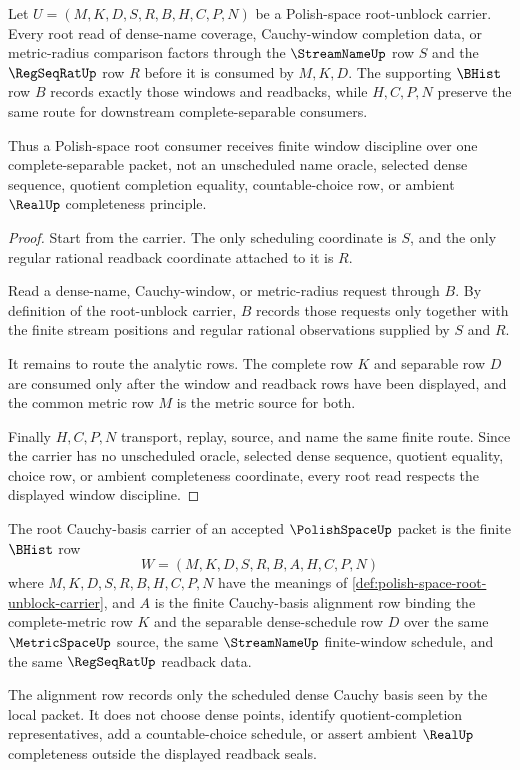 \begin{theorem}
\label{thm:polish-space-root-unblock-window-discipline}
Let $U=(M,K,D,S,R,B,H,C,P,N)$ be a Polish-space root-unblock carrier. Every root read of dense-name coverage, Cauchy-window completion data, or metric-radius comparison factors through the $\StreamNameUp$ row $S$ and the $\RegSeqRatUp$ row $R$ before it is consumed by $M,K,D$. The supporting $\BHist$ row $B$ records exactly those windows and readbacks, while $H,C,P,N$ preserve the same route for downstream complete-separable consumers.

Thus a Polish-space root consumer receives finite window discipline over one complete-separable packet, not an unscheduled name oracle, selected dense sequence, quotient completion equality, countable-choice row, or ambient $\RealUp$ completeness principle.
\end{theorem}
\begin{proof}
Start from the carrier. The only scheduling coordinate is $S$, and the only regular rational readback coordinate attached to it is $R$.

Read a dense-name, Cauchy-window, or metric-radius request through $B$. By definition of the root-unblock carrier, $B$ records those requests only together with the finite stream positions and regular rational observations supplied by $S$ and $R$.

It remains to route the analytic rows. The complete row $K$ and separable row $D$ are consumed only after the window and readback rows have been displayed, and the common metric row $M$ is the metric source for both.

Finally $H,C,P,N$ transport, replay, source, and name the same finite route. Since the carrier has no unscheduled oracle, selected dense sequence, quotient equality, choice row, or ambient completeness coordinate, every root read respects the displayed window discipline.
\end{proof}

\begin{definition}
\label{def:polishspace-root-cauchy-basis-carrier}
The root Cauchy-basis carrier of an accepted $\PolishSpaceUp$ packet is the finite $\BHist$ row
$$
W=(M,K,D,S,R,B,A,H,C,P,N)
$$
where $M,K,D,S,R,B,H,C,P,N$ have the meanings of \autoref{def:polish-space-root-unblock-carrier}, and $A$ is the finite Cauchy-basis alignment row binding the complete-metric row $K$ and the separable dense-schedule row $D$ over the same $\MetricSpaceUp$ source, the same $\StreamNameUp$ finite-window schedule, and the same $\RegSeqRatUp$ readback data.

The alignment row records only the scheduled dense Cauchy basis seen by the local packet. It does not choose dense points, identify quotient-completion representatives, add a countable-choice schedule, or assert ambient $\RealUp$ completeness outside the displayed readback seals.
\end{definition}

